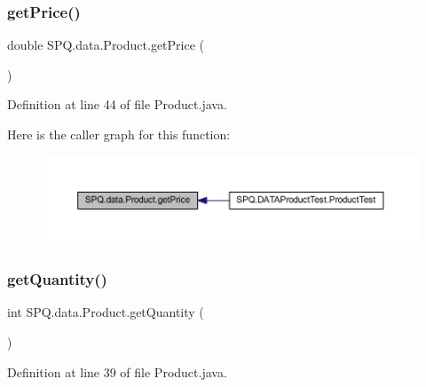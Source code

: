 \subsubsection{\texorpdfstring{get\+Price()}{getPrice()}\hspace{0.1cm}{\footnotesize\ttfamily [2/2]}}
{\footnotesize\ttfamily double S\+P\+Q.\+data.\+Product.\+get\+Price (\begin{DoxyParamCaption}{ }\end{DoxyParamCaption})}



Definition at line 44 of file Product.\+java.

Here is the caller graph for this function\+:
\nopagebreak
\begin{figure}[H]
\begin{center}
\leavevmode
\includegraphics[width=350pt]{class_s_p_q_1_1data_1_1_product_ad8200addd74d2e3b6ea9cfff4e8b8c7e_icgraph}
\end{center}
\end{figure}
\mbox{\label{class_s_p_q_1_1data_1_1_product_a1bcbc2a00b31563677cea1ab4cb8095c}} 
\subsubsection{\texorpdfstring{get\+Quantity()}{getQuantity()}}
{\footnotesize\ttfamily int S\+P\+Q.\+data.\+Product.\+get\+Quantity (\begin{DoxyParamCaption}{ }\end{DoxyParamCaption})}



Definition at line 39 of file Product.\+java.


